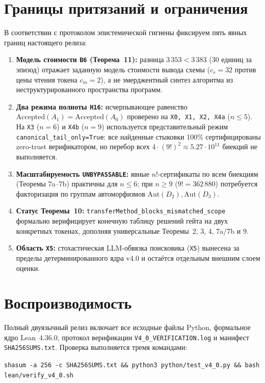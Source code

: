 \documentclass[10pt,a4paper]{article}
\newcommand{\code}[1]{\nolinkurl{#1}}
\begin{document}
\section{Границы притязаний и ограничения}

В соответствии с протоколом эпистемической гигиены фиксируем пять явных границ настоящего релиза:
\begin{enumerate}
\item \textbf{Модель стоимости \code{B6} (Теорема~11):} разница $3\,353 < 3\,383$ (30 единиц за эпизод) отражает заданную модель стоимости вывода схемы ($c_s = 32$ против цены чтения токена $c_m = 2$), а не эмерджентный синтез алгоритма из неструктурированного пространства программ.
\item \textbf{Два режима полноты \code{H16}:} исчерпывающее равенство $\mathrm{Accepted}(A_1) = \mathrm{Accepted}(A_0)$ проверено на \texttt{X0, X1, X2, X4a} ($n \le 5$). На \code{X3} ($n=6$) и \code{X4b} ($n=9$) используется представительный режим \code{canonical_tail_only=True}: все найденные стыковки 100\% сертифицированы zero-trust верификатором, но перебор всех $4\cdot(9!)^2 \approx 5.27\cdot 10^{11}$ биекций не выполняется.
\item \textbf{Масштабируемость \code{UNBYPASSABLE}:} явные $n!$-сертификаты по всем биекциям (Теоремы 7a--7b) практичны для $n \le 6$; при $n \ge 9$ ($9! = 362\,880$) потребуется факторизация по группам автоморфизмов $\mathrm{Aut}(D_2), \mathrm{Aut}(D_3)$.
\item \textbf{Статус Теоремы~10:} \code{transferMethod_blocks_mismatched_scope} формально верифицирует конечную таблицу решений гейта на двух конкретных токенах, дополняя универсальные Теоремы~2, 3, 4, 7a/7b и 9.
\item \textbf{Область \code{X5}:} стохастическая LLM-обвязка поисковика (\code{X5}) вынесена за пределы детерминированного ядра v4.0 и остаётся отдельным внешним слоем оценки.
\end{enumerate}

\section{Воспроизводимость}

Полный двуязычный релиз включает все исходные файлы Python, формальное ядро Lean~4.36.0, протокол верификации \code{V4_0_VERIFICATION.log} и манифест \code{SHA256SUMS.txt}. Проверка выполняется тремя командами:
\begin{center}
\small\texttt{shasum -a 256 -c SHA256SUMS.txt \&\& python3 python/test\_v4\_0.py \&\& bash lean/verify\_v4\_0.sh}
\end{center}
\end{document}
